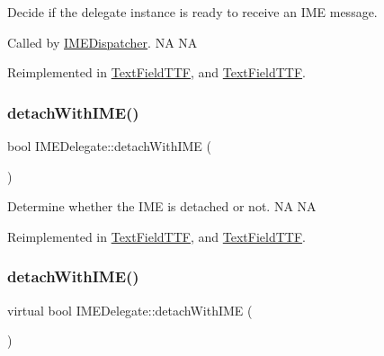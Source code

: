Decide if the delegate instance is ready to receive an I\+ME message. 

Called by \hyperlink{classIMEDispatcher}{I\+M\+E\+Dispatcher}.  NA  NA 

Reimplemented in \hyperlink{classTextFieldTTF_a63d746d65aa355275274db754f49652b}{Text\+Field\+T\+TF}, and \hyperlink{classTextFieldTTF_ae7c6616963045e08c065bf42e272f584}{Text\+Field\+T\+TF}.

\mbox{\label{classIMEDelegate_a3a795a554801741e5adbc6ad91682479}} 
\subsubsection{\texorpdfstring{detach\+With\+I\+M\+E()}{detachWithIME()}\hspace{0.1cm}{\footnotesize\ttfamily [1/2]}}
{\footnotesize\ttfamily bool I\+M\+E\+Delegate\+::detach\+With\+I\+ME (\begin{DoxyParamCaption}{ }\end{DoxyParamCaption})\hspace{0.3cm}{\ttfamily [virtual]}}

Determine whether the I\+ME is detached or not.  NA  NA 

Reimplemented in \hyperlink{classTextFieldTTF_a90dd42e2fff33f7f466457a355fac292}{Text\+Field\+T\+TF}, and \hyperlink{classTextFieldTTF_a9d003ddd53582cd13e043feb23788f6a}{Text\+Field\+T\+TF}.

\mbox{\label{classIMEDelegate_aeb1e2cc292dc195dec7a3f83156f5dd9}} 
\subsubsection{\texorpdfstring{detach\+With\+I\+M\+E()}{detachWithIME()}\hspace{0.1cm}{\footnotesize\ttfamily [2/2]}}
{\footnotesize\ttfamily virtual bool I\+M\+E\+Delegate\+::detach\+With\+I\+ME (\begin{DoxyParamCaption}{ }\end{DoxyParamCaption})\hspace{0.3cm}{\ttfamily [virtual]}}

